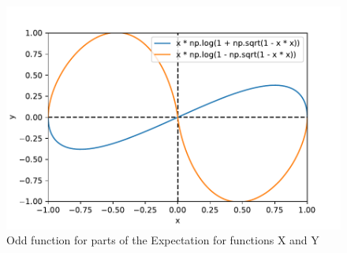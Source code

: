 \begin{figure}[h!]
\centering
\includegraphics[width=\textwidth]{pics/task_2_b_odd_func.pdf}
\caption{Odd function for parts of the Expectation for functions X and Y}\label{fig:task_2_b_odd_function}
\end{figure}
\FloatBarrier

